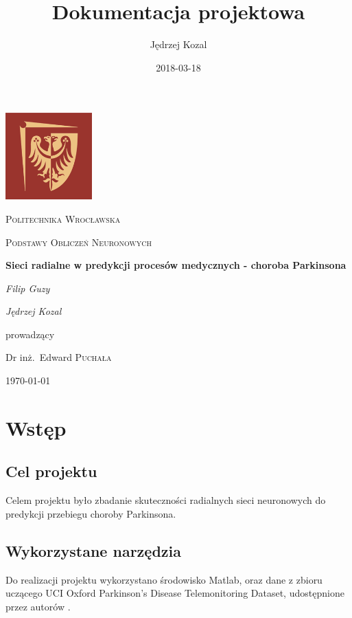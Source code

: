 \documentclass{article}
\title{Dokumentacja projektowa}
\date{2018-03-18}
\author{Jędrzej Kozal}
\begin{document}
\begin{titlepage}
	\centering
	\includegraphics[width=0.25\textwidth]{logo_pol_wroclaw.png}\par\vspace{1cm}
	{\scshape\LARGE Politechnika Wrocławska \par}
	\vspace{1cm}
	{\scshape\Large Podstawy Obliczeń Neuronowych\par}
	\vspace{1.5cm}
	{\huge\bfseries Sieci radialne w predykcji procesów medycznych - choroba Parkinsona \par}
	\vspace{2cm}
	{\Large\itshape Filip Guzy\par}
	{\Large\itshape Jędrzej Kozal\par}

	\vfill
	prowadzący\par
	Dr inż.~Edward \textsc{Puchała}

	\vfill

	{\large \today\par}
\end{titlepage}

\tableofcontents
\newpage


\section{Wstęp}

\subsection{Cel projektu}

Celem projektu było zbadanie skuteczności radialnych sieci neuronowych do predykcji przebiegu choroby Parkinsona.

\subsection{Wykorzystane narzędzia}

Do realizacji projektu wykorzystano środowisko Matlab, oraz dane z zbioru uczącego UCI Oxford Parkinson's Disease Telemonitoring Dataset, udostępnione przez autorów \cite{zbior uczacy}.
\end{document}
